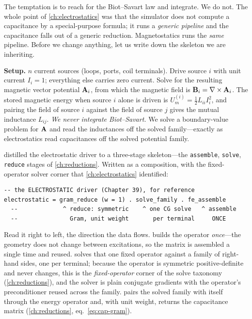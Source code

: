 The temptation is to reach for the Biot--Savart law and integrate. We do not. The
whole point of \cref{ch:electrostatics} was that the simulator does not compute a
capacitance by a special-purpose formula; it runs a \emph{generic pipeline} and the
capacitance falls out of a generic reduction. Magnetostatics runs the \emph{same}
pipeline. Before we change anything, let us write down the skeleton we are
inheriting.

\begin{physicsbox}
\textbf{Setup.} $n$ current sources (loops, ports, coil terminals). Drive source
$i$ with unit current $I_i=1$; everything else carries zero current. Solve for the
resulting magnetic vector potential $\mathbf{A}_i$, from which the magnetic field is
$\mathbf{B}_i=\nabla\times\mathbf{A}_i$. The stored magnetic energy when source $i$ alone is driven is
$U_m^{(i)}=\tfrac{1}{2}L_{ii}I_i^2$, and pairing the field of source $i$ against the
field of source $j$ gives the mutual inductance $L_{ij}$. \emph{We never integrate
Biot--Savart.} We solve a boundary-value problem for $\mathbf{A}$ and read the inductances
off the solved family---exactly as electrostatics read capacitances off the solved
potential family.
\end{physicsbox}

 distilled the electrostatic driver to a three-stage
skeleton---the \texttt{assemble}, \texttt{solve}, \texttt{reduce} stages of
\cref{ch:reductions}. Written as a composition, with the fixed-operator solver
corner that \cref{ch:electrostatics} identified:
\begin{lstlisting}[style=l4style]
-- the ELECTROSTATIC driver (Chapter 39), for reference
electrostatic = gram_reduce (w = 1) . solve_family . fe_assemble
  --             ^ reduce: symmetric    ^ one CG solve   ^ assemble
  --               Gram, unit weight       per terminal     ONCE
\end{lstlisting}
Read it right to left, the direction the data flows.  builds the
operator \emph{once}---the geometry does not change between excitations, so the
matrix is assembled a single time and reused.  solves that one
fixed operator against a family of right-hand sides, one per terminal; because the
operator is symmetric positive-definite and never changes, this is the
\emph{fixed-operator} corner of the solve taxonomy (\cref{ch:reductions}), and the
solver is plain conjugate gradients with the operator's preconditioner reused
across the family.  pairs the solved family with itself through
the energy operator and, with unit weight, returns the capacitance matrix
(\cref{ch:reductions}, eq.~\eqref{eq:cap-gram}).

